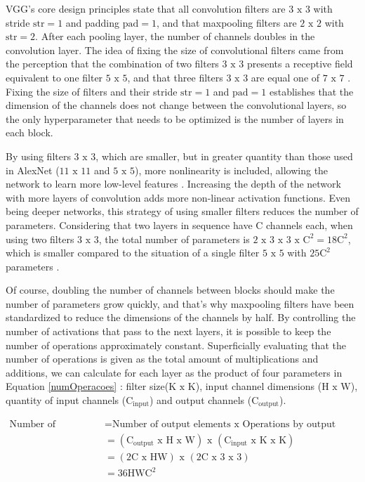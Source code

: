 VGG's core design principles state that all convolution filters are $3\text{ x }3$ with stride $\text{str} = 1$ and padding $\text{pad} = 1$, and that maxpooling filters are $2\text{ x }2$ with $\text{str} = 2$. After each pooling layer, the number of channels doubles in the convolution layer. The idea of fixing the size of convolutional filters came from the perception that the combination of two filters $3\text{ x }3$ presents a receptive field equivalent to one filter $5\text{ x }5$, and that three filters $3\text{ x }3$ are equal one of $7\text{ x }7$ \cite{elgendy2020}. Fixing the size of filters and their stride $\text{str} = 1$ and $\text{pad} = 1$ establishes that the dimension of the channels does not change between the convolutional layers, so the only hyperparameter that needs to be optimized is the number of layers in each block.

By using filters $3\text{ x }3$, which are smaller, but in greater quantity than those used in AlexNet ($11\text{ x }11$ and $5\text{ x }5$), more nonlinearity is included, allowing the network to learn more low-level features \cite{elgendy2020}. Increasing the depth of the network with more layers of convolution adds more non-linear activation functions. Even being deeper networks, this strategy of using smaller filters reduces the number of parameters. Considering that two layers in sequence have C channels each, when using two filters $3\text{ x }3$, the total number of parameters is $2\text{ x }3\text{ x }3\text{ x }\text{C}^2 = 18\text{C}^2$, which is smaller compared to the situation of a single filter $5\text{ x }5$ with $25\text{C}^2$ parameters \cite{johnson2019}.

Of course, doubling the number of channels between blocks should make the number of parameters grow quickly, and that's why maxpooling filters have been standardized to reduce the dimensions of the channels by half. By controlling the number of activations that pass to the next layers, it is possible to keep the number of operations approximately constant. Superficially evaluating that the number of operations is given as the total amount of multiplications and additions, we can calculate for each layer as the product of four parameters in Equation \ref{numOperacoes} \cite{johnson2019}: filter size($\text{K x K}$), input channel dimensions ($\text{H x W}$), quantity of input channels ($\text{C}_{\text{input}}$) and output channels ($\text{C}_{\text{output}}$).

\begin{equation}
\begin{split}
  \text{Number of operations} &= \text{Number of output elements x Operations by output element}\\
  &= (\text{C}_{\text{output}} \text{ x H x W}) \text{ x } (\text{C}_{\text{input}} \text{ x K x K})\\
  &= (2\text{C x HW}) \text{ x } (\text{2C x 3 x 3})\\
  &= 36 \text{HWC}^2
\end{split}
\label{numOperacoes}
\end{equation}

